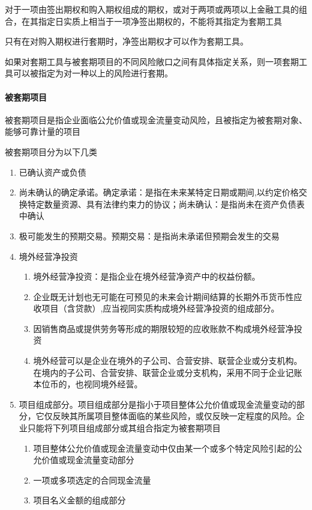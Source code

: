 \documentclass[UTF8,12pt]{ctexart}
\numberwithin{equation}{section} %
\numberwithin{figure}{section}
\numberwithin{table}{section}
\begin{document}
	对于一项由签出期权和购入期权组成的期权，或对于两项或两项以上金融工具的组合，在其指定日实质上相当于一项净签出期权的，不能将其指定为套期工具
	
	只有在对购入期权进行套期时，净签出期权才可以作为套期工具。
	
	如果对套期工具与被套期项目的不同风险敞口之间有具体指定关系，则一项套期工具可以被指定为对一种以上的风险进行套期。
	
	\paragraph{被套期项目}
	被套期项目是指企业面临公允价值或现金流量变动风险，且被指定为被套期对象、能够可靠计量的项目
	
	被套期项目分为以下几类
	\begin{enumerate}
		\item 已确认资产或负债
		
		\item 尚未确认的确定承诺。确定承诺：是指在未来某特定日期或期间,以约定价格交换特定数量资源、具有法律约束力的协议；尚未确认：是指尚未在资产负债表中确认
		
		\item 极可能发生的预期交易。预期交易：是指尚未承诺但预期会发生的交易
		
		\item 境外经营净投资
		\begin{enumerate}
			\item 境外经营净投资：是指企业在境外经营净资产中的权益份额。
			
			\item 企业既无计划也无可能在可预见的未来会计期间结算的长期外币货币性应收项目（含贷款）,应当视同实质构成境外经营净投资的组成部分。
			
			\item 因销售商品或提供劳务等形成的期限较短的应收账款不构成境外经营净投资
			
			\item 境外经营可以是企业在境外的子公司、合营安排、联营企业或分支机构。在境内的子公司、合营安排、联营企业或分支机构，采用不同于企业记账本位币的，也视同境外经营。
		\end{enumerate}
		
		\item 项目组成部分。项目组成部分是指小于项目整体公允价值或现金流量变动的部分，它仅反映其所属项目整体面临的某些风险，或仅反映一定程度的风险。企业只能将下列项目组成部分或其组合指定为被套期项目
		\begin{enumerate}
			\item 项目整体公允价值或现金流量变动中仅由某一个或多个特定风险引起的公允价值或现金流量变动部分
			
			\item 一项或多项选定的合同现金流量
			
			\item 项目名义金额的组成部分
		\end{enumerate}
	\end{enumerate}
\end{document}
